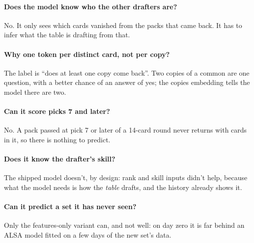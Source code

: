\documentclass[11pt,letterpaper]{article}
\begin{document}
\paragraph{Does the model know who the other drafters are?} No. It only sees which cards vanished from the
packs that came back. It has to infer what the table is drafting from that.

\paragraph{Why one token per distinct card, not per copy?} The label is ``does at least one copy come
back''. Two copies of a common are one question, with a better chance of an answer of yes; the copies
embedding tells the model there are two.

\paragraph{Can it score picks 7 and later?} No. A pack passed at pick 7 or later of a 14-card round never
returns with cards in it, so there is nothing to predict.

\paragraph{Does it know the drafter's skill?} The shipped model doesn't, by design: rank and skill inputs
didn't help, because what the model needs is how the \emph{table} drafts, and the history already shows it.

\paragraph{Can it predict a set it has never seen?} Only the features-only variant can, and not well: on day
zero it is far behind an ALSA model fitted on a few days of the new set's data.
\end{document}
